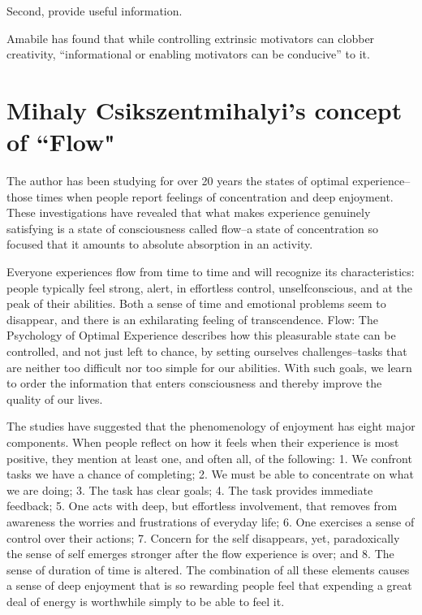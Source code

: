 Second, provide useful information.

Amabile has found that while controlling extrinsic motivators can clobber creativity, “informational or enabling motivators can be conducive” to it.



\section{Mihaly Csikszentmihalyi's concept of ``Flow"}
\label{sec:flow}

The author has been studying for over 20 years the states of optimal experience--those times when people report feelings of concentration and deep enjoyment. These investigations have revealed that what makes experience genuinely satisfying is a state of consciousness called flow--a state of concentration so focused that it amounts to absolute absorption in an activity. 

Everyone experiences flow from time to time and will recognize its characteristics: people typically feel strong, alert, in effortless control, unselfconscious, and at the peak of their abilities. Both a sense of time and emotional problems seem to disappear, and there is an exhilarating feeling of transcendence. Flow: The Psychology of Optimal Experience describes how this pleasurable state can be controlled, and not just left to chance, by setting ourselves challenges--tasks that are neither too difficult nor too simple for our abilities. With such goals, we learn to order the information that enters consciousness and thereby improve the quality of our lives.

The studies have suggested that the phenomenology of enjoyment has eight major components. When people reflect on how it feels when their experience is most positive, they mention at least one, and often all, of the following:
1. We confront tasks we have a chance of completing;
2. We must be able to concentrate on what we are doing; 3. The task has clear goals;
4. The task provides immediate feedback;
5. One acts with deep, but effortless involvement, that removes from awareness the worries and frustrations
of everyday life;
6. One exercises a sense of control over their actions;
7. Concern for the self disappears, yet, paradoxically
the sense of self emerges stronger after the flow experience is over; and
8. The sense of duration of time is altered.
The combination of all these elements causes a sense of deep enjoyment that is so rewarding people feel that expending a great deal of energy is worthwhile simply to be able to feel it.

